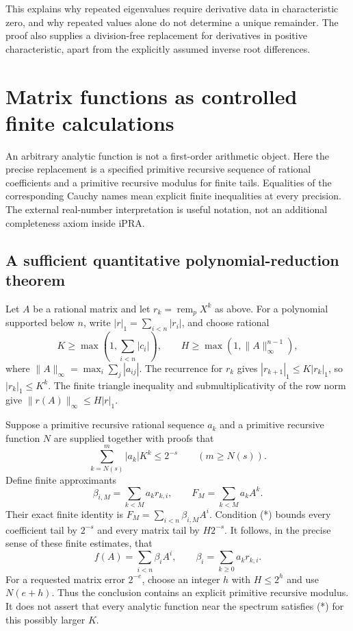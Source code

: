 This explains why repeated eigenvalues require derivative data in
characteristic zero, and why repeated values alone do not determine a
unique remainder. The proof also supplies a division-free replacement
for derivatives in positive characteristic, apart from the explicitly
assumed inverse root differences.

\section{Matrix functions as controlled finite calculations}

An arbitrary analytic function is not a first-order arithmetic object.
Here the precise replacement is a specified primitive recursive sequence
of rational coefficients and a primitive recursive modulus for finite
tails. Equalities of the corresponding Cauchy names mean explicit
finite inequalities at every precision. The external real-number
interpretation is useful notation, not an additional completeness axiom
inside iPRA.

\subsection{A sufficient quantitative polynomial-reduction theorem}

Let $A$ be a rational matrix and let $r_k=\operatorname{rem}_pX^k$ as
above. For a polynomial supported below $n$, write
$|r|_1=\sum_{i<n}|r_i|$, and choose rational
\[
 K\geq\max\left(1,\sum_{i<n}|c_i|\right),\qquad
 H\geq\max(1,\|A\|_\infty^{n-1}),
\]
where $\|A\|_\infty=\max_i\sum_j|a_{ij}|$.
The recurrence for $r_k$ gives
$|r_{k+1}|_1\leq K|r_k|_1$, so $|r_k|_1\leq K^k$.
The finite triangle inequality and submultiplicativity of the row norm
give $\|r(A)\|_\infty\leq H|r|_1$.

Suppose a primitive recursive rational sequence $a_k$ and a primitive
recursive function $N$ are supplied together with proofs that
\[
 \sum_{k=N(s)}^m |a_k|K^k\leq2^{-s}
 \qquad(m\geq N(s)).                                      \tag{*}
\]
Define finite approximants
\[
 \beta_{i,M}=\sum_{k<M}a_kr_{k,i},\qquad
 F_M=\sum_{k<M}a_kA^k.
\]
Their exact finite identity is
$F_M=\sum_{i<n}\beta_{i,M}A^i$. Condition (*) bounds every coefficient
tail by $2^{-s}$ and every matrix tail by $H2^{-s}$. It follows, in the
precise sense of these finite estimates, that
\[
 f(A)=\sum_{i<n}\beta_iA^i,\qquad
 \beta_i=\sum_{k\geq0}a_kr_{k,i}.
\]
For a requested matrix error $2^{-e}$, choose an integer $h$ with
$H\leq2^h$ and use $N(e+h)$. Thus the conclusion contains an explicit
primitive recursive modulus. It does not assert that every analytic
function near the spectrum satisfies (*) for this possibly larger $K$.

